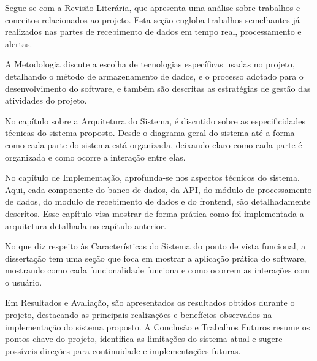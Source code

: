 Segue-se com a Revisão Literária, que apresenta uma análise sobre trabalhos e conceitos relacionados ao projeto. Esta seção engloba trabalhos semelhantes já realizados nas partes de recebimento de dados em tempo real, processamento e alertas.

A Metodologia discute a escolha de tecnologias específicas usadas no projeto, detalhando o método de armazenamento de dados, e o processo adotado para o desenvolvimento do software, e também são descritas as estratégias de gestão das atividades do projeto.

No capítulo sobre a Arquitetura do Sistema, é discutido sobre as especificidades técnicas do sistema proposto. Desde o diagrama geral do sistema até a forma como cada parte do sistema está organizada, deixando claro como cada parte é organizada e como ocorre a interação entre elas.

No capítulo de Implementação, aprofunda-se nos aspectos técnicos do sistema. Aqui, cada componente do banco de dados, da \gls{API}, do módulo de processamento de dados, do modulo de recebimento de dados e do frontend, são detalhadamente descritos. Esse capítulo visa mostrar de forma prática como foi implementada a arquitetura detalhada no capítulo anterior.

No que diz respeito às Características do Sistema do ponto de vista funcional, a dissertação tem uma seção que foca em mostrar a aplicação prática do software, mostrando como cada funcionalidade funciona e como ocorrem as interações com o usuário.

Em Resultados e Avaliação, são apresentados os resultados obtidos durante o projeto, destacando as principais realizações e benefícios observados na implementação do sistema proposto. A Conclusão e Trabalhos Futuros resume os pontos chave do projeto, identifica as limitações do sistema atual e sugere possíveis direções para continuidade e implementações futuras.




